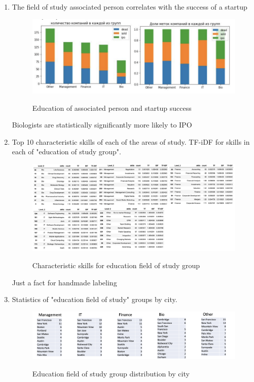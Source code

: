 \documentclass[12pt]{article}
\theoremstyle{plain}
\theoremstyle{definition}
\begin{document}
\begin{enumerate}
    \item The field of study associated person correlates with the success of a startup
    
    \begin{figure}[H]
      \centering
      \includegraphics[width=120mm]{figures/collection/EFOFS-success.png}
      \label{fig:gd}
      \caption{Education of associated person and startup success}
    \end{figure}
    
    Biologists are statistically significantly more likely to IPO
    
    \item Top 10 characteristic skills of each of the areas of study. TF-iDF for skills in each of "education of study group".
    
    \begin{figure}[H]
      \centering
      \includegraphics[width=160mm]{figures/collection/Characteristic-skills-per-group.png}
      \label{fig:gd}
      \caption{Characteristic skills for education field of study group}
    \end{figure}
    
    Just a fact for handmade labeling
    
    \item Statistics of "education field of study" groups by city.
    
    \begin{figure}[H]
      \centering
      \includegraphics[width=140mm]{figures/collection/City-efofs-group.png}
      \label{fig:gd}
      \caption{Education field of study group distribution by city}
    \end{figure}
    

\end{enumerate}
\end{document}
